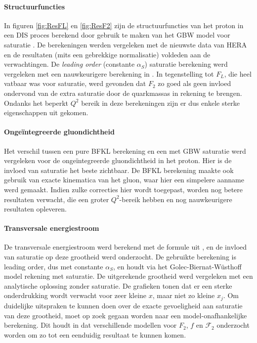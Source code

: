 \documentclass[a4paper,11pt]{article}
\numberwithin{equation}{section} %
\begin{document}
      \paragraph{Structuurfuncties}
In figuren \ref{fig:ResFL} en \ref{fig:ResF2} zijn de structuurfuncties van het proton in een DIS proces berekend door gebruik te maken van het GBW model voor saturatie \cite{GB} \cite{GBW}.
De berekeningen werden vergeleken met de nieuwste data van HERA \cite{H1} \cite{ZEUS} en de resultaten (mits een gebrekkige normalisatie) voldeden aan de verwachtingen.
De \textit{leading order} (constante $\alpha_S$) saturatie berekening werd vergeleken met een nauwkeurigere berekening in \cite{Stasto}.
In tegenstelling tot $F_L$, die heel vatbaar was voor saturatie, werd gevonden dat $F_2$ zo goed als geen invloed ondervond van de extra saturatie door de quarkmassas in rekening te brengen.
Ondanks het beperkt $Q^2$ bereik in deze berekeningen zijn er dus enkele sterke eigenschappen uit gekomen.

      \paragraph{Ongeïntegreerde gluondichtheid}
Het verschil tussen een pure BFKL berekening en een met GBW saturatie werd vergeleken voor de ongeïntegreerde gluondichtheid in het proton.
Hier is de invloed van saturatie het beste zichtbaar.
De BFKL berekening maakte ook gebruik van exacte kinematica van het gluon, waar hier een simpelere aanname werd gemaakt.
Indien zulke correcties hier wordt toegepast, worden nog betere resultaten verwacht, die een groter $Q^2$-bereik hebben en nog nauwkeurigere resultaten opleveren.

      \paragraph{Transversale energiestroom}
De transversale energiestroom werd berekend met de formule uit \cite{ET}, en de invloed van saturatie op deze grootheid werd onderzocht.
De gebruikte berekening is leading order, dus met constante $\alpha_S$, en houdt via het Golec-Biernat-Wüsthoff model rekening met saturatie.
De uitgerekende grootheid werd vergeleken met een analytische oplossing zonder saturatie.
De grafieken tonen dat er een sterke onderdrukking wordt verwacht voor zeer kleine $x$, maar niet zo kleine $x_j$.
Om duidelijke uitspraken te kunnen doen over de exacte gevoeligheid aan saturatie van deze grootheid, moet op zoek gegaan worden naar een model-onafhankelijke berekening.
Dit houdt in dat verschillende modellen voor $F_2$, $f$ en $\mathcal{F}_2$ onderzocht worden om zo tot een eenduidig resultaat te kunnen komen.
\end{document}
